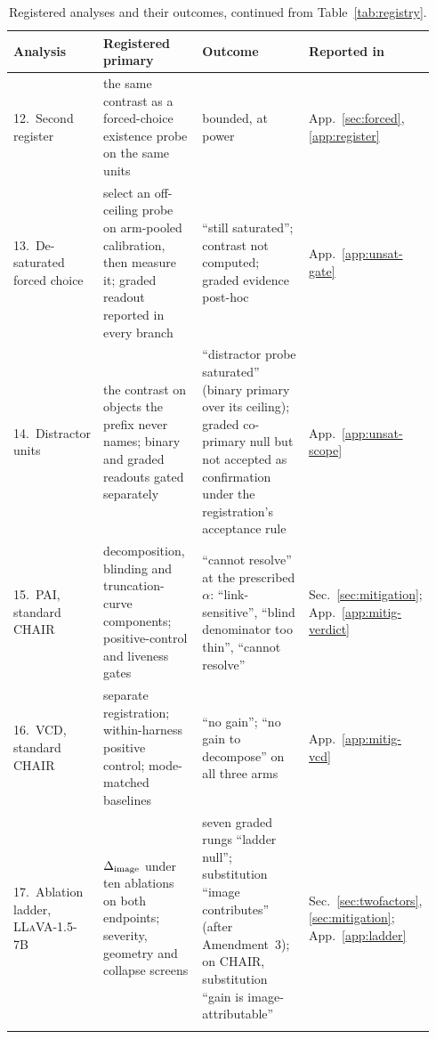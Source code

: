 \begin{table}[htbp]
\caption{Registered analyses and their outcomes, continued from Table~\ref{tab:registry}.}
\label{tab:registry2}
\begin{center}
\footnotesize
\setlength{\tabcolsep}{4pt}
\begin{tabular}{@{}p{0.17\linewidth}p{0.305\linewidth}p{0.345\linewidth}p{0.12\linewidth}@{}}
\toprule
\raggedright Analysis & \raggedright Registered primary & \raggedright Outcome &
\raggedright Reported in \tabularnewline
\midrule
\raggedright 12.\ Second register &
\raggedright the same contrast as a forced-choice existence probe on the same units &
\raggedright bounded, at power &
\raggedright App.~\ref{sec:forced}, \ref{app:register} \tabularnewline\addlinespace[1pt]
\raggedright 13.\ De-saturated forced choice &
\raggedright select an off-ceiling probe on arm-pooled calibration, then measure it; graded readout reported in every branch &
\raggedright ``still saturated''; contrast not computed; graded evidence post-hoc &
\raggedright App.~\ref{app:unsat-gate} \tabularnewline\addlinespace[1pt]
\raggedright 14.\ Distractor units &
\raggedright the contrast on objects the prefix never names; binary and graded readouts gated separately &
\raggedright ``distractor probe saturated'' (binary primary over its ceiling); graded co-primary null but not accepted as confirmation under the registration's acceptance rule &
\raggedright App.~\ref{app:unsat-scope} \tabularnewline
\midrule
\raggedright 15.\ PAI, standard CHAIR &
\raggedright decomposition, blinding and truncation-curve components; positive-control and liveness gates &
\raggedright ``cannot resolve'' at the prescribed $\alpha$: ``link-sensitive'', ``blind denominator too thin'', ``cannot resolve'' &
\raggedright Sec.~\ref{sec:mitigation}; App.~\ref{app:mitig-verdict} \tabularnewline\addlinespace[1pt]
\raggedright 16.\ VCD, standard CHAIR &
\raggedright separate registration; within-harness positive control; mode-matched baselines &
\raggedright ``no gain''; ``no gain to decompose'' on all three arms &
\raggedright App.~\ref{app:mitig-vcd} \tabularnewline
\midrule
\raggedright 17.\ Ablation ladder, \textsc{LLaVA-1.5-7B} &
\raggedright $\Delta_{\mathrm{image}}$ under ten ablations on both endpoints; severity, geometry and collapse screens &
\raggedright seven graded rungs ``ladder null''; substitution ``image contributes'' (after Amendment~3); on CHAIR, substitution ``gain is image-attributable'' &
\raggedright Sec.~\ref{sec:twofactors}, \ref{sec:mitigation}; App.~\ref{app:ladder} \tabularnewline\addlinespace[1pt]

\end{tabular}
\end{center}
\end{table}

